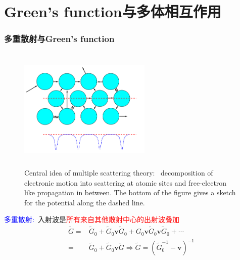 \section{\rm{Green's function}与多体相互作用}
\frame
{
	\frametitle{多重散射与\textrm{Green's function}}
\begin{figure}[h!]
	\vspace{-0.55in}
\centering
\includegraphics[height=2.32in,width=2.48in,viewport=5 0 515 475,clip]{Figures/multiple-scattering_theory.png}
\caption{\tiny \textrm{Central idea of multiple scattering theory:~ decomposition of electronic motion into scattering at atomic sites and free-electron like propagation in between. The bottom of the figure gives a sketch for the potential along the dashed line.}}
\label{Multi-scattering}
\end{figure}
\textcolor{blue}{多重散射:~}入射波是\textcolor{red}{所有来自其他散射中心的出射波叠加}
			\begin{displaymath}
				\begin{aligned}
					\tilde G=&\tilde G_0+\tilde G_0\mathbf{v}\tilde G_0+G_0\mathbf{v}\tilde G_0\mathbf{v}\tilde G_0+\cdots\\
					=&\tilde G_0+\tilde G_0\mathbf{v}\tilde G \Longrightarrow \tilde G=(\tilde G_0^{-1}-\mathbf{v})^{-1}
				\end{aligned}
			\end{displaymath}
}

